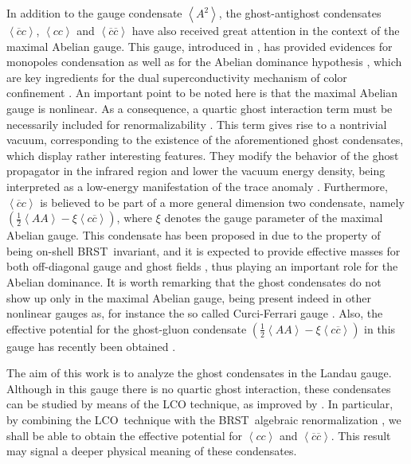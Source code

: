 \documentclass[a4paper,12pt]{article}
\begin{document}
In addition to the gauge condensate $\left\langle A^{2}\right\rangle $, the
ghost-antighost condensates $\left\langle \overline{c}c\right\rangle $, $%
\left\langle cc\right\rangle $ and $\left\langle \overline{c}\overline{c}%
\right\rangle $ have also received great attention \cite{ms,k,sp,dd,work} in
the context of the maximal Abelian gauge. This gauge, introduced in \cite
{th,ks}, has provided evidences for monopoles condensation as well as for
the Abelian dominance hypothesis \cite{th,abd}, which are key ingredients
for the dual superconductivity mechanism of color confinement \cite{scon,th}%
. An important point to be noted here is that the maximal Abelian gauge is
nonlinear. As a consequence, a quartic ghost interaction term must be
necessarily included for renormalizability \cite{mp,fz}. This term gives
rise to a nontrivial vacuum, corresponding to the existence of the
aforementioned ghost condensates, which display rather interesting features.
They modify the behavior of the ghost propagator in the infrared region \cite
{ms,k,sp} and lower the vacuum energy density, being interpreted as a
low-energy manifestation of the trace anomaly \cite{ms,k}. Furthermore, $%
\left\langle \overline{c}c\right\rangle $ is believed to be part of a more
general dimension two condensate, namely $\left( \frac{1}{2}\left\langle
AA\right\rangle -\xi \left\langle c\overline{c}\right\rangle \right) $,
where $\xi $ denotes the gauge parameter of the maximal Abelian gauge. This
condensate has been proposed in \cite{ope} due to the property of being
on-shell BRST\ invariant, and it is expected to provide effective masses for
both off-diagonal gauge and ghost fields \cite{ope,dd}, thus playing an
important role for the Abelian dominance. It is worth remarking that the
ghost condensates do not show up only in the maximal Abelian gauge, being
present indeed in other nonlinear gauges as, for instance the so called
Curci-Ferrari gauge \cite{cf,cf1,cf2}. Also, the effective potential for the
ghost-gluon condensate $\left( \frac{1}{2}\left\langle AA\right\rangle -\xi
\left\langle c\overline{c}\right\rangle \right) $ in this gauge has recently
been obtained  \cite{gg}.

The aim of this work is to analyze the ghost condensates in the Landau
gauge. Although in this gauge there is no quartic ghost interaction, these
condensates can be studied by means of the LCO technique, as improved by 
\cite{v2,v3}. In particular, by combining the LCO\ technique with the BRST\
algebraic renormalization \cite{book}, we shall be able to obtain the
effective potential for $\left\langle cc\right\rangle $ and $\left\langle 
\overline{c}\overline{c}\right\rangle $. This result may signal a deeper
physical meaning of these condensates.
\end{document}
